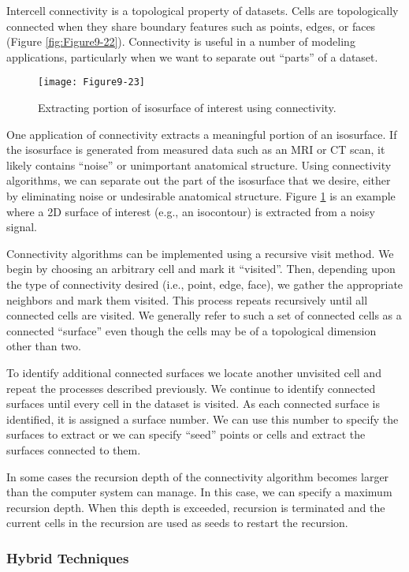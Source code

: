 Intercell connectivity is a topological property of datasets. Cells are topologically connected when they share boundary features such as points, edges, or faces (Figure \ref{fig:Figure9-22}). Connectivity is useful in a number of modeling applications, particularly when we want to separate out ``parts'' of a dataset.

\begin{figure}[!htb]
	\centering
	\texttt{[image: Figure9-23]}
	\caption{Extracting portion of isosurface of interest using connectivity.}
	\label{fig:Figure9-23}
\end{figure}

One application of connectivity extracts a meaningful portion of an isosurface. If the isosurface is generated from measured data such as an MRI or CT scan, it likely contains ``noise'' or unimportant anatomical structure. Using connectivity algorithms, we can separate out the part of the isosurface that we desire, either by eliminating noise or undesirable anatomical structure. Figure \ref{fig:Figure9-23} is an example where a 2D surface of interest (e.g., an isocontour) is extracted from a noisy signal.

Connectivity algorithms can be implemented using a recursive visit method. We begin by choosing an arbitrary cell and mark it ``visited''. Then, depending upon the type of connectivity desired (i.e., point, edge, face), we gather the appropriate neighbors and mark them visited. This process repeats recursively until all connected cells are visited. We generally refer to such a set of connected cells as a connected ``surface'' even though the cells may be of a topological dimension other than two.

To identify additional connected surfaces we locate another unvisited cell and repeat the processes described previously. We continue to identify connected surfaces until every cell in the dataset is visited. As each connected surface is identified, it is assigned a surface number. We can use this number to specify the surfaces to extract or we can specify ``seed'' points or cells and extract the surfaces connected to them.

In some cases the recursion depth of the connectivity algorithm becomes larger than the computer system can manage. In this case, we can specify a maximum recursion depth. When this depth is exceeded, recursion is terminated and the current cells in the recursion are used as seeds to restart the recursion.

\subsubsection{Hybrid Techniques}

